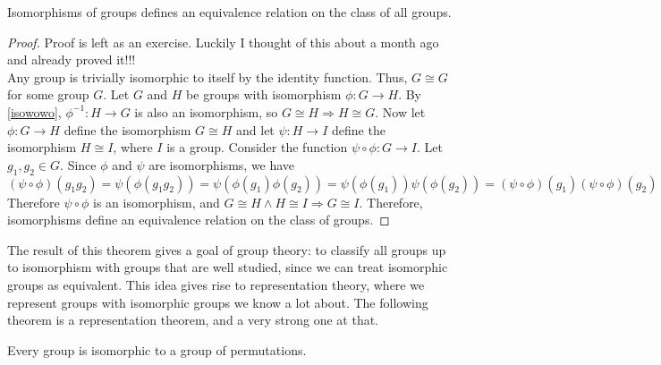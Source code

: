 \documentclass[12pt, letterpaper]{report}
\begin{document}
\begin{theorem}
	Isomorphisms of groups defines an equivalence relation on the class of all groups.
\end{theorem}
\begin{proof}
	Proof is left as an exercise. Luckily I thought of this about a month ago and already proved it!!!\\
	Any group is trivially isomorphic to itself by the identity function. Thus, \(G\cong G\) for some group \(G\). Let \(G\) and \(H\) be groups with isomorphism \(\phi :G\to H\). By \ref{isowowo}, \(\phi ^{-1} :H\to G\) is also an isomorphism, so \(G\cong H \Longrightarrow H\cong G\). Now let \(\phi:G\to H \) define the isomorphism \(G\cong H\) and let \(\psi:H\to I \) define the isomorphism \(H\cong I\), where \(I\) is a group. Consider the function \(\psi \circ \phi :G\to I\). Let \(g_1,g_2\in G\). Since \(\phi \) and \(\psi \) are isomorphisms, we have 
	\[
		(\psi \circ \phi )(g_1 g_2)=\psi (\phi (g_1 g_2))=\psi (\phi (g_1)\phi (g_2))=\psi (\phi (g_1))\psi (\phi (g_2))=(\psi \circ \phi )(g_1)(\psi \circ \phi )(g_2)
	\]
	Therefore \(\psi \circ \phi \) is an isomorphism, and \(G\cong H \land H\cong I \Longrightarrow G\cong I\). Therefore, isomorphisms define an equivalence relation on the class of groups.
\end{proof}
The result of this theorem gives a goal of group theory: to classify all groups up to isomorphism with groups that are well studied, since we can treat isomorphic groups as equivalent. This idea gives rise to representation theory, where we represent groups with isomorphic groups we know a lot about. The following theorem is a representation theorem, and a very strong one at that.
\begin{theorem}[Cayley]
	Every group is isomorphic to a group of permutations.
\end{theorem}
\end{document}
